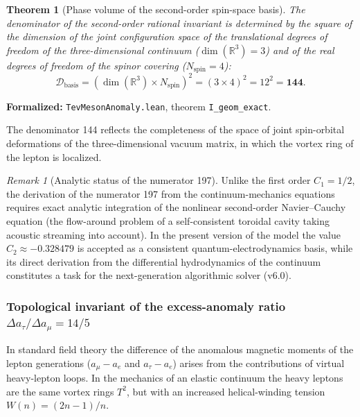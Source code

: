 \documentclass[11pt,a4paper]{article}
\newtheorem{theorem}{Theorem}
\theoremstyle{definition}
\theoremstyle{remark}
\newtheorem{remark}{Remark}
\begin{document}
\begin{theorem}[Phase volume of the second-order spin-space basis]
\label{thm:geometric_denominator_144}
    The denominator of the second-order rational invariant is determined by the square of the dimension of the joint configuration space of the translational degrees of freedom of the three-dimensional continuum ($\dim(\mathbb{R}^3) = 3$) and of the real degrees of freedom of the spinor covering ($N_{\mathrm{spin}} = 4$):
\begin{equation}
    \mathcal{D}_{\mathrm{basis}} = \left( \dim(\mathbb{R}^3) \times N_{\mathrm{spin}} \right)^2 = (3 \times 4)^2 = 12^2 = \mathbf{144}.
    \label{eq:denominator_144_origin}
\end{equation}
\end{theorem}

\noindent\small\textbf{Formalized:} \texttt{TevMesonAnomaly.lean}, theorem \texttt{I_geom_exact}.

The denominator 144 reflects the completeness of the space of joint spin-orbital deformations of the three-dimensional vacuum matrix, in which the vortex ring of the lepton is localized.

\begin{remark}[Analytic status of the numerator 197]
    Unlike the first order $C_1 = 1/2$, the derivation of the numerator 197 from the continuum-mechanics equations requires exact analytic integration of the nonlinear second-order Navier--Cauchy equation (the flow-around problem of a self-consistent toroidal cavity taking acoustic streaming into account). In the present version of the model the value $C_2 \approx -0.328479$ is accepted as a consistent quantum-electrodynamics basis, while its direct derivation from the differential hydrodynamics of the continuum constitutes a task for the next-generation algorithmic solver (v6.0).
\end{remark}

\subsubsection{Topological invariant of the excess-anomaly ratio $\Delta a_\tau / \Delta a_\mu = 14/5$}

In standard field theory the difference of the anomalous magnetic moments of the lepton generations ($a_\mu - a_e$ and $a_\tau - a_e$) arises from the contributions of virtual heavy-lepton loops. In the mechanics of an elastic continuum the heavy leptons are the same vortex rings $T^2$, but with an increased helical-winding tension $W(n) = (2n-1)/n$.
\end{document}
